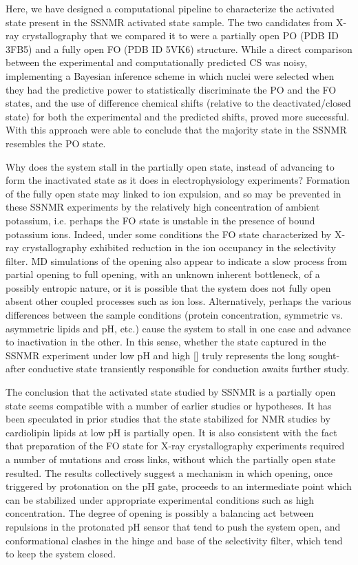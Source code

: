 \documentclass[%
 aip,
 amsmath,amssymb,
 preprint,%
]{revtex4-1}
\begin{document}
Here, we have designed a computational pipeline to characterize the activated state present in the SSNMR activated state sample. The two candidates from X-ray crystallography that we compared it to were a partially open PO (PDB ID 3FB5) and a fully open FO (PDB ID 5VK6) structure. While a direct comparison between the experimental and computationally predicted CS was noisy, implementing a Bayesian inference scheme in which nuclei were selected when they had the predictive power to statistically discriminate the PO and the FO states, and the use of difference chemical shifts (relative to the deactivated/closed state) for both the experimental and the predicted shifts, proved more successful. With this approach were able to conclude that the majority state in the SSNMR resembles the PO state. 

Why does the system stall in the partially open state, instead of advancing to form the inactivated state as it does in electrophysiology experiments? Formation of the fully open state may linked to ion expulsion, and so may be prevented in these SSNMR experiments by the relatively high concentration of ambient potassium, i.e. perhaps the FO state is unstable in the presence of bound potassium ions.  Indeed, under some conditions the FO state characterized by X-ray crystallography exhibited reduction in the ion occupancy in the selectivity filter.\cite{Cuello2010}  MD simulations of the opening also appear to indicate a slow process from partial opening to full opening,  with an unknown inherent bottleneck, of a possibly entropic nature, or it is possible that the system does not fully open absent other coupled processes such as ion loss. Alternatively, perhaps the various differences between the sample conditions (protein concentration, symmetric vs. asymmetric lipids and pH, etc.) cause the system to stall in one case and advance to inactivation in the other. In this sense, whether the state captured in the SSNMR experiment under low pH and high [] truly represents the long sought-after conductive state transiently responsible for conduction awaits further study. 

The conclusion that the activated state studied by SSNMR is a partially open state seems compatible with a number of earlier studies or hypotheses. It has been speculated in prior studies that the state stabilized for NMR studies by cardiolipin lipids at low pH is partially open.\cite{VanderCruijsen2017} It is also consistent with the fact that preparation of the FO state for  X-ray crystallography experiments required a number of mutations and cross links, without which the partially open state resulted. The results collectively suggest a mechanism in which opening, once triggered by protonation on the pH gate, proceeds to an intermediate point which can be stabilized under appropriate experimental conditions such as high  concentration.  The degree of opening is possibly a balancing act between repulsions in the protonated pH sensor that tend to push the system open, and conformational clashes in the hinge and base of the selectivity filter, which tend to keep the system closed. 
\end{document}

